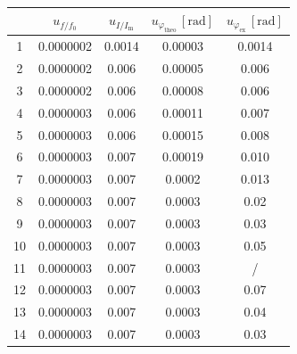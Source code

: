 \documentclass{article}
\begin{document}
\begin{table}[H]\centering
    \begin{tabular}{ccccc}
        \toprule
           & $u_{f/f_0}$ & $u_{I/I_\text{m}}$ & $u_{\varphi_\text{theo}}\,[\text{rad}]$ & $u_{\varphi_\text{ex}}\,[\text{rad}]$ \\
        \midrule
        1  & 0.0000002   & 0.0014             & 0.00003                                 & 0.0014                                \\
        2  & 0.0000002   & 0.006              & 0.00005                                 & 0.006                                 \\
        3  & 0.0000002   & 0.006              & 0.00008                                 & 0.006                                 \\
        4  & 0.0000003   & 0.006              & 0.00011                                 & 0.007                                 \\
        5  & 0.0000003   & 0.006              & 0.00015                                 & 0.008                                 \\
        6  & 0.0000003   & 0.007              & 0.00019                                 & 0.010                                 \\
        7  & 0.0000003   & 0.007              & 0.0002                                  & 0.013                                 \\
        8  & 0.0000003   & 0.007              & 0.0003                                  & 0.02                                  \\
        9  & 0.0000003   & 0.007              & 0.0003                                  & 0.03                                  \\
        10 & 0.0000003   & 0.007              & 0.0003                                  & 0.05                                  \\
        11 & 0.0000003   & 0.007              & 0.0003                                  & /                                     \\
        12 & 0.0000003   & 0.007              & 0.0003                                  & 0.07                                  \\
        13 & 0.0000003   & 0.007              & 0.0003                                  & 0.04                                  \\
        14 & 0.0000003   & 0.007              & 0.0003                                  & 0.03                                  \\

\end{tabular}
\end{table}
\end{document}
